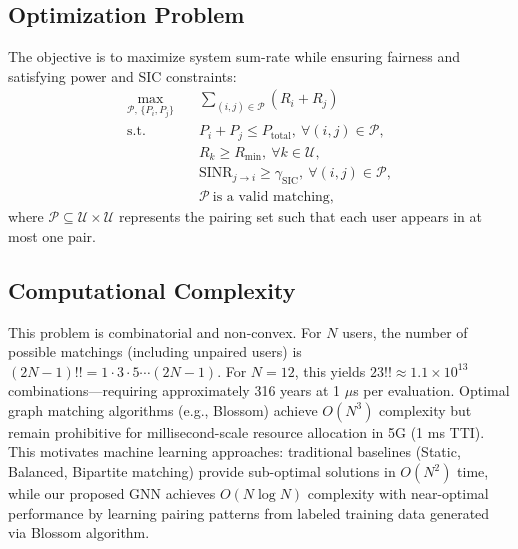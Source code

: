 \subsection{Optimization Problem}
The objective is to maximize system sum-rate while ensuring fairness and satisfying power and SIC constraints:
\begin{equation}
\begin{aligned}
\max_{\mathcal{P},\,\{P_i,P_j\}} \quad & \sum_{(i,j)\in\mathcal{P}} (R_i + R_j) \\
\text{s.t.} \quad &
P_i + P_j \leq P_{\text{total}}, \ \forall (i,j)\in\mathcal{P}, \\
& R_k \geq R_{\min}, \ \forall k\in\mathcal{U}, \\
& \text{SINR}_{j \to i} \geq \gamma_{\text{SIC}}, \ \forall (i,j)\in\mathcal{P}, \\
& \mathcal{P}\ \text{is a valid matching},
\end{aligned}
\end{equation}
where $\mathcal{P} \subseteq \mathcal{U} \times \mathcal{U}$ represents the pairing set such that each user appears in at most one pair.

\subsection{Computational Complexity}
This problem is combinatorial and non-convex. For $N$ users, the number of possible matchings (including unpaired users) is $(2N-1)!! = 1 \cdot 3 \cdot 5 \cdots (2N-1)$. For $N=12$, this yields $23!! \approx 1.1 \times 10^{13}$ combinations—requiring approximately 316 years at 1 $\mu$s per evaluation. Optimal graph matching algorithms (e.g., Blossom) achieve $O(N^3)$ complexity but remain prohibitive for millisecond-scale resource allocation in 5G (1 ms TTI). This motivates machine learning approaches: traditional baselines (Static, Balanced, Bipartite matching) provide sub-optimal solutions in $O(N^2)$ time, while our proposed GNN achieves $O(N \log N)$ complexity with near-optimal performance by learning pairing patterns from labeled training data generated via Blossom algorithm.
